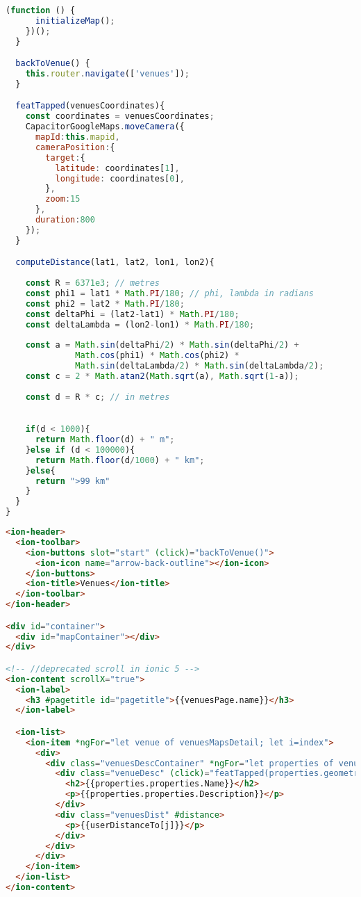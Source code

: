\begin{lstlisting}[language=JavaScript, label={lst:venues-map.page.ts}, caption=venues-map.page.ts]
    (function () {
      initializeMap();
    })();
  }

  backToVenue() {
    this.router.navigate(['venues']);
  }

  featTapped(venuesCoordinates){
    const coordinates = venuesCoordinates;
    CapacitorGoogleMaps.moveCamera({
      mapId:this.mapid,
      cameraPosition:{
        target:{
          latitude: coordinates[1],
          longitude: coordinates[0],
        },
        zoom:15
      },
      duration:800
    });     
  } 

  computeDistance(lat1, lat2, lon1, lon2){
    
    const R = 6371e3; // metres
    const phi1 = lat1 * Math.PI/180; // phi, lambda in radians
    const phi2 = lat2 * Math.PI/180;
    const deltaPhi = (lat2-lat1) * Math.PI/180;
    const deltaLambda = (lon2-lon1) * Math.PI/180;
    
    const a = Math.sin(deltaPhi/2) * Math.sin(deltaPhi/2) +
              Math.cos(phi1) * Math.cos(phi2) *
              Math.sin(deltaLambda/2) * Math.sin(deltaLambda/2);
    const c = 2 * Math.atan2(Math.sqrt(a), Math.sqrt(1-a));
    
    const d = R * c; // in metres

    
    if(d < 1000){
      return Math.floor(d) + " m";
    }else if (d < 100000){
      return Math.floor(d/1000) + " km";
    }else{
      return ">99 km"
    }
  }
}

\end{lstlisting} 

\begin{lstlisting}[language=html, label={lst:venues-map.page.html}, caption=venues-map.page.html]
<ion-header>
  <ion-toolbar>
    <ion-buttons slot="start" (click)="backToVenue()">
      <ion-icon name="arrow-back-outline"></ion-icon>
    </ion-buttons>
    <ion-title>Venues</ion-title>
  </ion-toolbar>
</ion-header>

<div id="container">
  <div id="mapContainer"></div>
</div>

<!-- //deprecated scroll in ionic 5 -->
<ion-content scrollX="true"> 
  <ion-label>
    <h3 #pagetitle id="pagetitle">{{venuesPage.name}}</h3>
  </ion-label>

  <ion-list>
    <ion-item *ngFor="let venue of venuesMapsDetail; let i=index">
      <div>
        <div class="venuesDescContainer" *ngFor="let properties of venue.geojson.features; let j = index">
          <div class="venueDesc" (click)="featTapped(properties.geometry.coordinates)">
            <h2>{{properties.properties.Name}}</h2>
            <p>{{properties.properties.Description}}</p>
          </div>
          <div class="venuesDist" #distance>
            <p>{{userDistanceTo[j]}}</p>
          </div>
        </div>
      </div>
    </ion-item>
  </ion-list>
</ion-content>


\end{lstlisting}